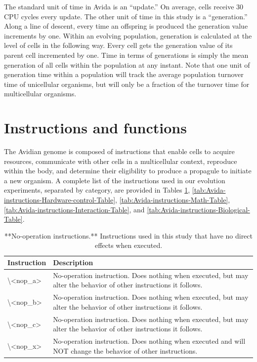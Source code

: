 \documentclass[
]{book}
\begin{document}
The standard unit of time in Avida is an ``update.'' On average, cells receive 30 CPU cycles every update. The other unit of time in this study is a ``generation.'' Along a line of descent, every time an offspring is produced the generation value increments by one. Within an evolving population, generation is calculated at the level of cells in the following way. Every cell gets the generation value of its parent cell incremented by one. Time in terms of generations is simply the mean generation of all cells within the population at any instant. Note that one unit of generation time within a population will track the average population turnover time of unicellular organisms, but will only be a fraction of the turnover time for multicellular organisms.

\hypertarget{instructions-and-functions}{%
\section{Instructions and functions}\label{instructions-and-functions}}

The Avidian genome is composed of instructions that enable cells to acquire resources, communicate with other cells in a multicellular context, reproduce within the body, and determine their eligibility to produce a propagule to initiate a new organism. A complete list of the instructions used in our evolution experiments, separated by category, are provided in Tables \ref{tab:Avida-instructions-No-operation-Table}, \ref{tab:Avida-instructions-Hardware-control-Table},
\ref{tab:Avida-instructions-Math-Table},
\ref{tab:Avida-instructions-Interaction-Table}, and
\ref{tab:Avida-instructions-Biological-Table}.

\begin{table}

\caption{\label{tab:Avida-instructions-No-operation-Table}**No-operation instructions.** Instructions used in this study that have no direct effects when executed.}
\centering
\begin{tabular}[t]{ll}
\toprule
Instruction & Description\\
\midrule
\textbackslash{}<nop\_a> & No-operation instruction.  Does nothing when executed, but may alter the behavior of other instructions it follows.\\
\textbackslash{}<nop\_b> & No-operation instruction.  Does nothing when executed, but may alter the behavior of other instructions it follows.\\
\textbackslash{}<nop\_c> & No-operation instruction.  Does nothing when executed, but may alter the behavior of other instructions it follows.\\
\textbackslash{}<nop\_x> & No-operation instruction.  Does nothing when executed and will NOT change the behavior of other instructions.\\
\bottomrule
\end{tabular}
\end{table}
\end{document}
